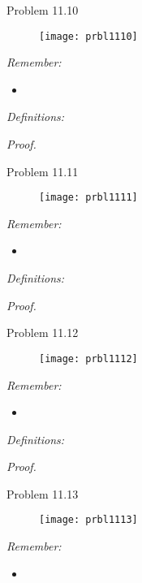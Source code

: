 \Large{Problem 11.10}
\begin{figure}[H]
    \centering
    \texttt{[image: prbl1110]}
    \label{fig:prbl1110}
\end{figure}

\textit{Remember:}
\begin{itemize}
	\item 
\end{itemize}

\textit{Definitions:}


\textit{Proof.}

\clearpage


\Large{Problem 11.11}
\begin{figure}[H]
    \centering
    \texttt{[image: prbl1111]}
    \label{fig:prbl1111}
\end{figure}

\textit{Remember:}
\begin{itemize}
	\item 
\end{itemize}

\textit{Definitions:}


\textit{Proof.}

\clearpage


\Large{Problem 11.12}
\begin{figure}[H]
    \centering
    \texttt{[image: prbl1112]}
    \label{fig:prbl1112}
\end{figure}

\textit{Remember:}
\begin{itemize}
	\item 
\end{itemize}

\textit{Definitions:}


\textit{Proof.}

\clearpage



\Large{Problem 11.13}
\begin{figure}[H]
    \centering
    \texttt{[image: prbl1113]}
    \label{fig:prbl1113}
\end{figure}

\textit{Remember:}
\begin{itemize}
	\item 
\end{itemize}

